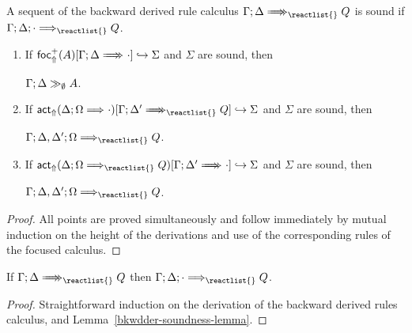 \begin{definition}
  A sequent of the backward derived rule calculus
  $\zbneuseq{\Gamma}{\Delta}{\reactlist{}}{Q}$
  is sound if $\ztriseq{\Gamma}{\Delta}{\cdot}{\reactlist{}}{Q}$.
\end{definition}

\begin{lemma}\label{bkwdder-soundness-lemma}
  \begin{enumerate}
  \item If $\brfrelj{A}{\zbneuseq{\Gamma}{\Delta}{}{\cdot}}{\Sigma}$
    and $\Sigma$
    are sound, then

    $\Gamma; \Delta \gg_{\emptyset} A$.
  \item If
    $\bactrelj{\zsyseq{\Delta}{\Omega}{}{\cdot}}
    {\zbneuseq{\Gamma}{\Delta'}{\reactlist{}}{Q}}{\Sigma}$
    and $\Sigma$ are sound, then

    $\ztriseq{\Gamma}{\Delta, \Delta'}{\Omega}{\reactlist{}}{Q}$.
  \item If
    $\bactrelj{\zsyseq{\Delta}{\Omega}{\reactlist{}}{Q}}
    {\zbneuseq{\Gamma}{\Delta'}{}{\cdot}}{\Sigma}$
    and $\Sigma$ are sound, then

    $\ztriseq{\Gamma}{\Delta, \Delta'}{\Omega}{\reactlist{}}{Q}$.
  \end{enumerate}
\end{lemma}
\begin{proof}
  All points are proved simultaneously and follow immediately by mutual
  induction on the height of the derivations and use of the corresponding rules
  of the focused calculus.
\end{proof}

\begin{theorem}[Soundness]
  If $\zbneuseq{\Gamma}{\Delta}{\reactlist{}}{Q}$ then
  $\ztriseq{\Gamma}{\Delta}{\cdot}{\reactlist{}}{Q}$.
\end{theorem}
\begin{proof}
  Straightforward induction on the derivation of the backward derived rules
  calculus, and Lemma~\ref{bkwdder-soundness-lemma}.
\end{proof}

